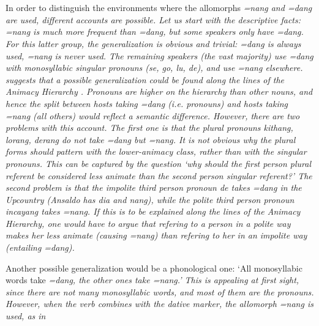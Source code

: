  \\
 \\
In order to distinguish the environments where the allomorphs \em =nang \em and \em =dang \em are used, different accounts are possible. Let us start with the descriptive facts: \em =nang \em is much more frequent than \em =dang\em, but some speakers only have \em =dang\em. For this latter group, the generalization is obvious and trivial: \em =dang \em is always used, \em =nang \em is never used. The remaining speakers (the vast majority) use \em =dang \em with monosyllabic singular pronouns (\em se,  go, lu, de\em), and use \em =nang \em elsewhere. \citet{Ansaldo2005ms, Ansaldo2008genesis, Ansaldo2009} suggests that a possible generalization could be found along the lines of the Animacy Hierarchy \citep{Silverstein1976}. Pronouns are higher on the hierarchy than other nouns, and hence the split between hosts taking \em =dang \em (i.e. pronouns) and hosts taking \em =nang \em (all others) would reflect a semantic difference. However, there are two problems with this account. The first one is that the plural pronouns \em kithang, lorang, derang \em do not take \em =dang \em but \em =nang\em. It is not obvious why the plural forms should pattern with the lower-animacy class, rather than with the singular pronouns. This can be captured by the question `why should the first person plural referent be considered less animate than the second person singular referent?' The second problem is that the impolite third person pronoun \em de \em takes \em =dang \em in the Upcountry (Ansaldo has \em dia \em and \em nang\em), while the polite third person pronoun \em incayang \em takes \em =nang\em. If this is to be explained along the lines of the Animacy Hierarchy, one would have to argue that  refering to a person in a polite way makes her less animate (causing \em =nang\em) than refering to her in an impolite way (entailing \em =dang\em).

Another possible generalization would be a phonological one: `All monosyllabic words take \em =dang\em, the other ones take  \em =nang\em.' This is appealing at first sight, since there are not many monosyllabic words, and most of them are the pronouns. However, when the verb  combines with the dative marker, the allomorph \em =nang \em is used, as in 

